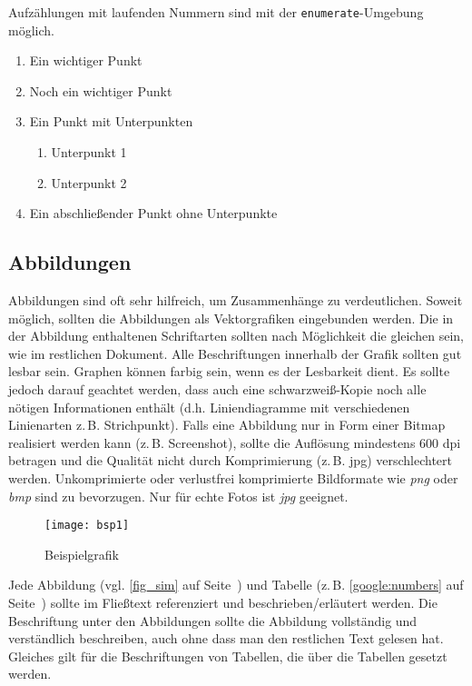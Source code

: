 \documentclass[conference,compsoc,final,a4paper]{IEEEtran}
\begin{document}
Aufzählungen mit laufenden Nummern sind mit der \texttt{enumerate}-Umgebung möglich.

\begin{enumerate}
  \item Ein wichtiger Punkt
  \item Noch ein wichtiger Punkt
  \item Ein Punkt mit Unterpunkten
    \begin{enumerate}
      \item Unterpunkt 1
      \item Unterpunkt 2
    \end{enumerate}
  \item Ein abschließender Punkt ohne Unterpunkte
\end{enumerate}

\subsection{Abbildungen}
Abbildungen sind oft sehr hilfreich, um Zusammenhänge zu verdeutlichen. Soweit möglich, sollten die Abbildungen als Vektorgrafiken eingebunden werden. Die in der Abbildung enthaltenen Schriftarten sollten nach Möglichkeit die gleichen sein, wie im restlichen Dokument. Alle Beschriftungen innerhalb der Grafik sollten gut lesbar sein.
Graphen können farbig sein, wenn es der Lesbarkeit dient. Es sollte jedoch darauf geachtet werden, dass auch eine schwarz\-weiß-Kopie noch alle nötigen Informationen enthält (d.h. Liniendiagramme mit verschiedenen Linienarten z.\,B. Strichpunkt).
Falls eine Abbildung nur in Form einer Bitmap realisiert werden kann (z.\,B. Screenshot), sollte die Auflösung mindestens 600 dpi betragen und die Qualität nicht durch Komprimierung (z.\,B. jpg) verschlechtert werden. Unkomprimierte oder verlustfrei komprimierte Bildformate wie \emph{png} oder \emph{bmp} sind zu bevorzugen. Nur für echte Fotos ist \emph{jpg} geeignet.

\begin{figure}[!ht]
\centering
\texttt{[image: bsp1]}
\caption{Beispielgrafik~\cite{Dean2012}}
\label{fig_sim}
\end{figure}

Jede Abbildung (vgl. \autoref{fig_sim} auf Seite~\pageref{fig_sim}) und Tabelle (z.\,B. \autoref{google:numbers} auf Seite~\pageref{google:numbers}) sollte im Fließtext referenziert und beschrieben/erläutert werden. Die Beschriftung unter den Abbildungen sollte die Abbildung vollständig und verständlich beschreiben, auch ohne dass man den restlichen Text gelesen hat. Gleiches gilt für die Beschriftungen von Tabellen, die über die Tabellen gesetzt werden.
\end{document}
